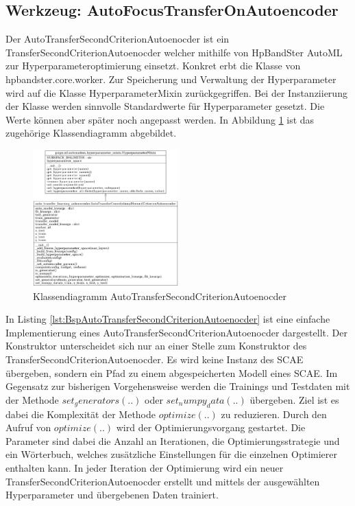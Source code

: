 		\subsection{Werkzeug: AutoFocusTransferOnAutoencoder}
		\label{sec:AutoTransferSecondCriterionAutoenocder}
		Der AutoTransferSecondCriterionAutoenocder ist ein TransferSecondCriterionAutoenocder welcher mithilfe von HpBandSter AutoML zur Hyperparameteroptimierung einsetzt. Konkret  erbt die Klasse von hpbandster.core.worker. Zur Speicherung und Verwaltung der Hyperparameter wird auf die Klasse HyperparameterMixin zurückgegriffen. Bei der Instanziierung der Klasse werden sinnvolle Standardwerte für Hyperparameter gesetzt. Die Werte können aber später noch angepasst werden. 
		In Abbildung \ref{img:KlassendiagrammAutoTransferSecondCriterionAutoenocder}  ist das zugehörige Klassendiagramm abgebildet. 
		\begin{figure}[h]
			\centering
			\includegraphics[width=0.5\textwidth, center]{bilder/Klassendiagramme/Klassendiagramm_AutoTLCSCAE.png}
			\caption[Klassendiagramm AutoTransferSecondCriterionAutoenocder]{Klassendiagramm AutoTransferSecondCriterionAutoenocder}
			\label{img:KlassendiagrammAutoTransferSecondCriterionAutoenocder}
		\end{figure}  
		In Listing \ref{lst:BspAutoTransferSecondCriterionAutoenocder} ist eine einfache Implementierung eines AutoTransferSecondCriterionAutoenocder dargestellt. Der Konstruktor unterscheidet sich nur an einer Stelle zum Konstruktor des TransferSecondCriterionAutoenocder. Es wird keine Instanz des SCAE übergeben, sondern ein Pfad zu einem abgespeicherten Modell eines SCAE. 
		Im Gegensatz zur bisherigen Vorgehensweise werden die Trainings und Testdaten mit der Methode $set_generators(..)$  oder $set_numpy_data(..)$ übergeben. Ziel ist es dabei die Komplexität der Methode $optimize(..)$ zu reduzieren. Durch den Aufruf von $optimize(..)$ wird der Optimierungsvorgang gestartet. Die Parameter sind dabei die Anzahl an Iterationen, die Optimierungsstrategie und ein Wörterbuch, welches zusätzliche Einstellungen für die einzelnen Optimierer enthalten kann. In jeder Iteration der Optimierung wird ein neuer TransferSecondCriterionAutoenocder erstellt und mittels der ausgewählten Hyperparameter und übergebenen Daten trainiert. 
